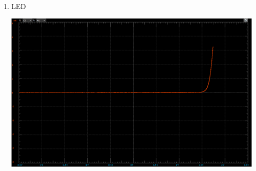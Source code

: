 \documentclass[12pt]{article}
\begin{document}
\begin{enumerate}
\begin{enumerate}
\begin{center}
        \end{center}
        \setcounter{enumii}{5}
        \item LED
        \begin{center}
            \includegraphics[width=\linewidth]{images/B3f.png}
        \end{center}
    \end{enumerate}
    

\end{enumerate}
\end{document}
